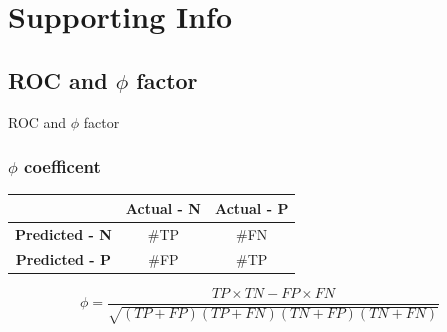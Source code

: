 \documentclass{beamer}
\begin{document}
\section{Supporting Info}

\subsection{ROC and $\phi$ factor}
\begin{frame}{}
\begin{center}
{\Huge ROC and $\phi$ factor}
\end{center}
\end{frame}


\begin{frame}
\begin{center}
\frametitle{$\phi$ coefficent}
\begin{table}[]
\begin{tabular}{c|c|c}
\multicolumn{1}{l|}{\textbf{}} & \textbf{Actual - N} & \textbf{Actual - P} \\ \hline
\textbf{Predicted - N}         & \#TP                & \#FN                \\ \hline
\textbf{Predicted - P}         & \#FP                & \#TP               
\end{tabular}
\end{table}
\begin{equation*}
\phi=\dfrac{TP\times TN - FP\times FN}{\sqrt{\left(TP+FP\right)\left(TP+FN\right)\left(TN+FP\right)\left(TN+FN\right)}}
\end{equation*}
\end{center}
\end{frame}
\end{document}
